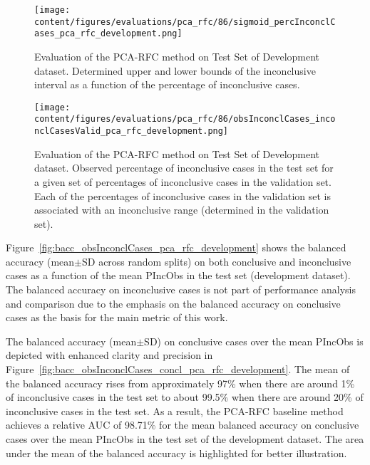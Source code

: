 \begin{figure}[ht]
  \centering
  \texttt{[image: content/figures/evaluations/pca\_rfc/86/sigmoid\_percInconclCases\_pca\_rfc\_development.png]}
  \caption{Evaluation of the PCA-RFC method on Test Set of Development dataset. 
  Determined upper and lower bounds of the inconclusive interval as a function of the percentage of inconclusive cases.} 
  \label{fig:pca_rfc_percInconclCases_development}
\end{figure}


\begin{figure}[ht]
  \centering
  \texttt{[image: content/figures/evaluations/pca\_rfc/86/obsInconclCases\_inconclCasesValid\_pca\_rfc\_development.png]}
  \caption{Evaluation of the PCA-RFC method on Test Set of Development dataset.
  Observed percentage of inconclusive cases in the test set 
  for a given set of percentages of inconclusive cases in the validation set.
  Each of the percentages of inconclusive cases in the validation set is associated 
  with an inconclusive range (determined in the validation set).} 
  \label{fig:obsInconclCases_inconclCasesValid_pca_rfc_development}
\end{figure} 


Figure~\ref{fig:bacc_obsInconclCases_pca_rfc_development} shows the balanced accuracy (mean$\pm$SD across random splits) 
on both conclusive and inconclusive cases as a function of the mean PIncObs
in the test set (development dataset).
The balanced accuracy on inconclusive cases is not part of performance analysis and comparison 
due to the emphasis on the balanced accuracy on conclusive cases as the basis for the main metric of this work.

The balanced accuracy (mean$\pm$SD) on conclusive cases over the mean PIncObs
is depicted with enhanced clarity and precision in Figure~\ref{fig:bacc_obsInconclCases_concl_pca_rfc_development}.
The mean of the balanced accuracy rises from approximately 97\% 
when there are around 1\% of inconclusive cases in the test set to about 99.5\% 
when there are around 20\% of inconclusive cases in the test set.
As a result, the PCA-RFC baseline method achieves a relative AUC of 98.71\% for the mean balanced accuracy on conclusive cases
over the mean PIncObs in the test set of the development dataset.
The area under the mean of the balanced accuracy is highlighted for better illustration.



